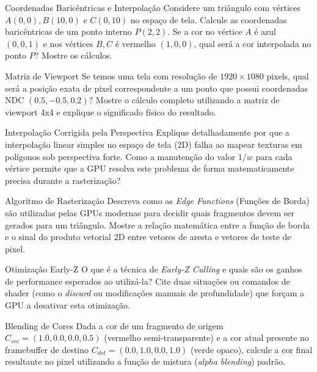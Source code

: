 \begin{exercicio}{Coordenadas Baricêntricas e Interpolação}
    Considere um triângulo com vértices $A(0,0), B(10,0)$ e $C(0,10)$ no espaço de tela. Calcule as coordenadas baricêntricas de um ponto interno $P(2,2)$. Se a cor no vértice $A$ é azul $(0,0,1)$ e nos vértices $B, C$ é vermelho $(1,0,0)$, qual será a cor interpolada no ponto $P$? Mostre os cálculos.
\end{exercicio}

\begin{exercicio}{Matriz de Viewport}
    Se temos uma tela com resolução de $1920 \times 1080$ pixels, qual será a posição exata de pixel correspondente a um ponto que possui coordenadas NDC $(0.5, -0.5, 0.2)$? Mostre o cálculo completo utilizando a matriz de viewport 4x4 e explique o significado físico do resultado.
\end{exercicio}

\begin{exercicio}{Interpolação Corrigida pela Perspectiva}
    Explique detalhadamente por que a interpolação linear simples no espaço de tela (2D) falha ao mapear texturas em polígonos sob perspectiva forte. Como a manutenção do valor $1/w$ para cada vértice permite que a GPU resolva este problema de forma matematicamente precisa durante a rasterização?
\end{exercicio}

\begin{exercicio}{Algoritmo de Rasterização}
    Descreva como as \textit{Edge Functions} (Funções de Borda) são utilizadas pelas GPUs modernas para decidir quais fragmentos devem ser gerados para um triângulo. Mostre a relação matemática entre a função de borda e o sinal do produto vetorial 2D entre vetores de aresta e vetores de teste de pixel.
\end{exercicio}

\begin{exercicio}{Otimização Early-Z}
    O que é a técnica de \textit{Early-Z Culling} e quais são os ganhos de performance esperados ao utilizá-la? Cite duas situações ou comandos de shader (como o \textit{discard} ou modificações manuais de profundidade) que forçam a GPU a desativar esta otimização.
\end{exercicio}

\begin{exercicio}{Blending de Cores}
    Dada a cor de um fragmento de origem $C_{src} = (1.0, 0.0, 0.0, 0.5)$ (vermelho semi-transparente) e a cor atual presente no framebuffer de destino $C_{dst} = (0.0, 1.0, 0.0, 1.0)$ (verde opaco), calcule a cor final resultante no pixel utilizando a função de mistura (\textit{alpha blending}) padrão.
\end{exercicio}


